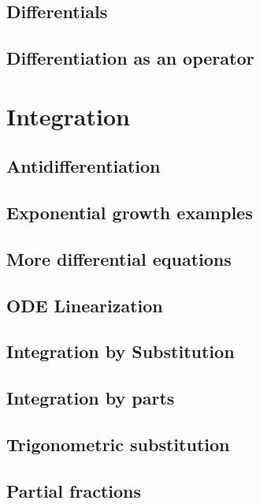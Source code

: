 \documentclass[twoside,openright,titlepage,a4paper]{book}
\begin{document}
\begin{sloppypar}
\section{Differentials} \label{ChDifferentiationSecDifferentials}
\section{Differentiation as an operator} \label{ChDifferentiationSecDifferentiationAsAnOperator}

\chapter{Integration} \label{ChIntegration}
\section{Antidifferentiation} \label{ChIntegrationSecAntidifferentiation}
\section{Exponential growth examples} \label{ChIntegrationSecExponentialGrowthExamples}
\section{More differential equations} \label{ChIntegrationSecMoreDifferentialEquations}
\section{ODE Linearization} \label{ChIntegrationSecODELinearization}
\section{Integration by Substitution} \label{ChIntegrationSecIntegrationBySubstitution}
\section{Integration by parts} \label{ChIntegrationSecIntegrationByParts}
\section{Trigonometric substitution} \label{ChIntegrationSecTrigonometricSubstitution}
\section{Partial fractions} \label{ChIntegrationSecPartialFractions}

\end{sloppypar}
\end{document}
